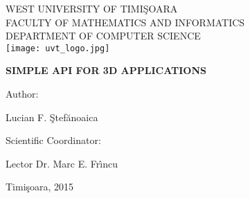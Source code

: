\begin{titlepage}	
	\begin{center}
		\footnotesize
		WEST UNIVERSITY OF TIMI\c SOARA\\
		FACULTY OF MATHEMATICS AND INFORMATICS\\
		DEPARTMENT OF COMPUTER SCIENCE\\
		\texttt{[image: uvt\_logo.jpg]}
	\end{center}
	
	\begin{center}
		\vspace*{2.5cm}
		\LARGE
		\textbf{SIMPLE API FOR 3D APPLICATIONS}
	\end{center}
	\vspace{2.5cm}
	\begin{minipage}[t]{7cm}
		\flushleft
		\large{Author:}
	
		Lucian F. \c Stef\u anoaica
	\end{minipage}
	\hfill
	\begin{minipage}[t]{7cm}
		\flushright
		\large{Scientific Coordinator:}
	
		Lector Dr. Marc E. Fr\^ \i ncu
	\end{minipage}
	
	\vfill
	
	\begin{center}
		Timi\c soara, 2015
	\end{center}
\end{titlepage}